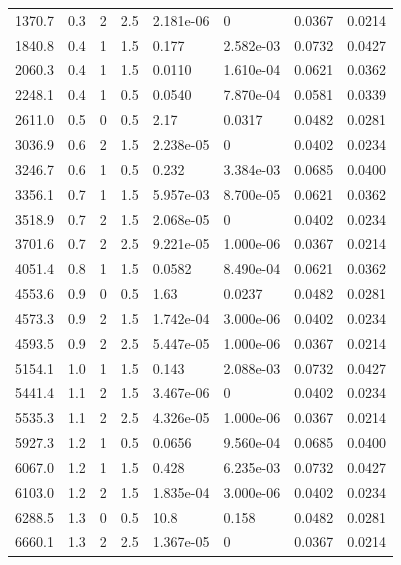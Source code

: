 \documentclass[preview]{standalone}
\begin{document}
{{\begin{tabular}{L{1.2cm}C{1.2cm} C{0.3cm}C{0.5cm} C{1.4cm}C{1.4cm} C{1.4cm}C{1.4cm}}
  1370.7  &   0.3  & 2     & 2.5 &  2.181e-06  & 0  & 0.0367 &  0.0214   \\ 
  1840.8  &   0.4  & 1     & 1.5 &  0.177  & 2.582e-03  & 0.0732 &  0.0427   \\ 
  2060.3  &   0.4  & 1     & 1.5 &  0.0110  & 1.610e-04  & 0.0621 &  0.0362   \\ 
  2248.1  &   0.4  & 1     & 0.5 &  0.0540  & 7.870e-04  & 0.0581 &  0.0339   \\ 
  2611.0  &   0.5  & 0     & 0.5 &  2.17  & 0.0317  & 0.0482 &  0.0281   \\ 
  3036.9  &   0.6  & 2     & 1.5 &  2.238e-05  & 0  & 0.0402 &  0.0234   \\ 
  3246.7  &   0.6  & 1     & 0.5 &  0.232  & 3.384e-03  & 0.0685 &  0.0400   \\ 
  3356.1  &   0.7  & 1     & 1.5 &  5.957e-03  & 8.700e-05  & 0.0621 &  0.0362   \\ 
  3518.9  &   0.7  & 2     & 1.5 &  2.068e-05  & 0  & 0.0402 &  0.0234   \\ 
  3701.6  &   0.7  & 2     & 2.5 &  9.221e-05  & 1.000e-06  & 0.0367 &  0.0214   \\ 
  4051.4  &   0.8  & 1     & 1.5 &  0.0582  & 8.490e-04  & 0.0621 &  0.0362   \\ 
  4553.6  &   0.9  & 0     & 0.5 &  1.63  & 0.0237  & 0.0482 &  0.0281   \\ 
  4573.3  &   0.9  & 2     & 1.5 &  1.742e-04  & 3.000e-06  & 0.0402 &  0.0234   \\ 
  4593.5  &   0.9  & 2     & 2.5 &  5.447e-05  & 1.000e-06  & 0.0367 &  0.0214   \\ 
  5154.1  &   1.0  & 1     & 1.5 &  0.143  & 2.088e-03  & 0.0732 &  0.0427   \\ 
  5441.4  &   1.1  & 2     & 1.5 &  3.467e-06  & 0  & 0.0402 &  0.0234   \\ 
  5535.3  &   1.1  & 2     & 2.5 &  4.326e-05  & 1.000e-06  & 0.0367 &  0.0214   \\ 
  5927.3  &   1.2  & 1     & 0.5 &  0.0656  & 9.560e-04  & 0.0685 &  0.0400   \\ 
  6067.0  &   1.2  & 1     & 1.5 &  0.428  & 6.235e-03  & 0.0732 &  0.0427   \\ 
  6103.0  &   1.2  & 2     & 1.5 &  1.835e-04  & 3.000e-06  & 0.0402 &  0.0234   \\ 
  6288.5  &   1.3  & 0     & 0.5 &  10.8  & 0.158  & 0.0482 &  0.0281   \\ 
  6660.1  &   1.3  & 2     & 2.5 &  1.367e-05  & 0  & 0.0367 &  0.0214   \\ 

\end{tabular}}}
\end{document}
